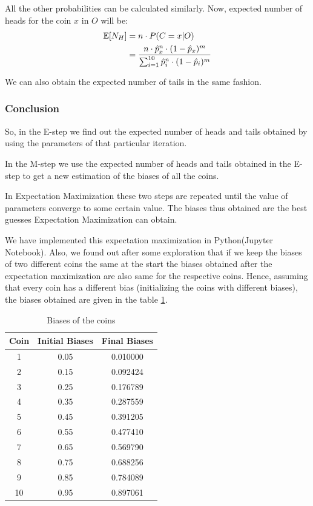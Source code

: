 \documentclass[journal, compsoc]{IEEEtran}
\begin{document}
All the other probabilities can be calculated similarly. Now, expected number of heads for the coin $x$ in $O$ will be:
\begin{equation}
\label{eqn:heads}
\begin{aligned}
\mathbb{E}[N_{H}] &= n \cdot P(C = x | O) \hspace{2mm}\\
&= \frac{n\cdot \hat{p}_{x}^{n}\cdot (1 - \hat{p}_{x})^{m}}{\sum_{i = 1}^{10} \hat{p}_{i}^{n}\cdot (1 - \hat{p}_{i})^{m}}
\end{aligned}
\end{equation}

We can also obtain the expected number of tails in the same fashion.

\subsubsection{Conclusion}
So, in the E-step we find out the expected number of heads and tails obtained by using the parameters of that particular iteration.

In the M-step we use the expected number of heads and tails obtained in the E-step to get a new estimation of the biases of all the coins.

In Expectation Maximization these two steps are repeated until the value of parameters converge to some certain value. The biases thus obtained
are the best guesses Expectation Maximization can obtain.

We have implemented this expectation maximization in Python(Jupyter Notebook). Also, we found out after some exploration that if
we keep the biases of two different coins the same at the start the biases obtained after the expectation maximization are also
same for the respective coins.
Hence, assuming that every coin has a different bias (initializing the coins with different biases),
the biases obtained are given in the table \ref{table:biases}.
\begin{table}[!h]
\renewcommand{\arraystretch}{0.4}
\caption{Biases of the coins}
\label{table:biases}
\centering
\begin{tabular}{|c|c|c|}
\hline
{\bfseries Coin} & {\bfseries Initial Biases} & {\bfseries Final Biases}\\
\hline\hline
1 & 0.05 & 0.010000\\
\hline
2 & 0.15 & 0.092424\\
\hline
3 & 0.25 & 0.176789\\
\hline
4 & 0.35 & 0.287559\\
\hline
5 & 0.45 & 0.391205\\
\hline
6 & 0.55 & 0.477410\\
\hline
7 & 0.65 & 0.569790\\
\hline
8 & 0.75 & 0.688256\\
\hline
9 & 0.85 & 0.784089\\
\hline
10 & 0.95 & 0.897061\\
\hline
\end{tabular}
\end{table}
\end{document}
